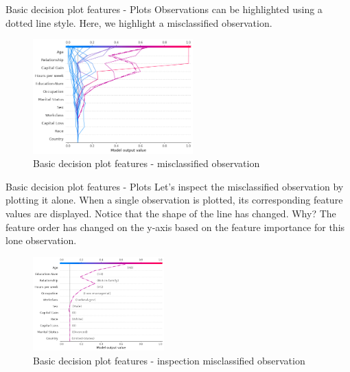 \documentclass[aspectratio=169]{beamer}
\begin{document}
\begin{frame}{Basic decision plot features - Plots}
Observations can be highlighted using a dotted line style. Here, we highlight a misclassified observation.
    \begin{figure}[htbp]
        \centering
        \includegraphics[width=0.55\textwidth]{figs/shap/plots/decision/example_notebooks_api_examples_plots_decision_plot_12_0.png}
        \caption{Basic decision plot features - misclassified observation}
        \label{fig:misclassified-decision}
    \end{figure}
\end{frame}

\begin{frame}{Basic decision plot features - Plots}
Let’s inspect the misclassified observation by plotting it alone. When a single observation is plotted, its corresponding feature values are displayed. Notice that the shape of the line has changed. Why? The feature order has changed on the y-axis based on the feature importance for this lone observation. 
    \begin{figure}[htbp]
        \centering
        \includegraphics[width=0.45\textwidth]{figs/shap/plots/decision/example_notebooks_api_examples_plots_decision_plot_14_0.png}
        \caption{Basic decision plot features - inspection misclassified observation}
        \label{fig:inspection-misclassified-decision}
    \end{figure}
\end{frame}
\end{document}
